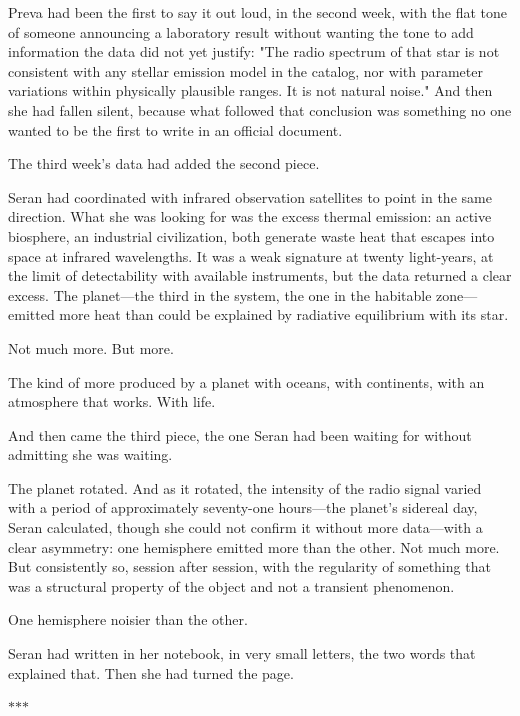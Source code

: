 \documentclass[11pt,a5paper,twoside]{book}
\begin{document}
Preva had been the first to say it out loud, in the second week, with the flat tone of someone announcing a laboratory result without wanting the tone to add information the data did not yet justify: "The radio spectrum of that star is not consistent with any stellar emission model in the catalog, nor with parameter variations within physically plausible ranges. It is not natural noise." And then she had fallen silent, because what followed that conclusion was something no one wanted to be the first to write in an official document.

The third week's data had added the second piece.

Seran had coordinated with infrared observation satellites to point in the same direction. What she was looking for was the excess thermal emission: an active biosphere, an industrial civilization, both generate waste heat that escapes into space at infrared wavelengths. It was a weak signature at twenty light-years, at the limit of detectability with available instruments, but the data returned a clear excess. The planet—the third in the system, the one in the habitable zone—emitted more heat than could be explained by radiative equilibrium with its star.

Not much more. But more.

The kind of more produced by a planet with oceans, with continents, with an atmosphere that works. With life.

And then came the third piece, the one Seran had been waiting for without admitting she was waiting.

The planet rotated. And as it rotated, the intensity of the radio signal varied with a period of approximately seventy-one hours—the planet's sidereal day, Seran calculated, though she could not confirm it without more data—with a clear asymmetry: one hemisphere emitted more than the other. Not much more. But consistently so, session after session, with the regularity of something that was a structural property of the object and not a transient phenomenon.

One hemisphere noisier than the other.

Seran had written in her notebook, in very small letters, the two words that explained that. Then she had turned the page.

\vspace{1.5em}
\begin{center}$\ast$\quad$\ast$\quad$\ast$\end{center}
\vspace{1.5em}
\end{document}
